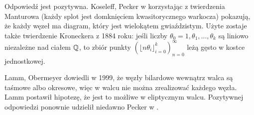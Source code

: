 Odpowiedź jest pozytywna.
Koseleff, Pecker w \cite{koseleff14} korzystając z twierdzenia Manturowa (każdy splot jest domknięciem kwasitorycznego warkocza) pokazują, że każdy węzeł ma diagram, który jest wielokątem gwiaździstym.
Użyte zostaje także twierdzenie Kroneckera z 1884 roku: jeśli liczby $\theta_0 = 1, \theta_1, \ldots, \theta_k$ są liniowo niezależne nad ciałem $\mathbb Q$, to zbiór punkty $(\lfloor n\theta_i \rfloor_{i=0}^k)_{n=0}^\infty$ leżą gęsto w kostce jednostkowej.

Lamm, Obermeyer dowiedli w 1999, że węzły bilardowe wewnątrz walca są taśmowe albo okresowe, więc w walcu nie można zrealizować każdego węzła.
Lamm postawił hipotezę, że jest to możliwe w eliptycznym walcu.
Pozytywnej odpowiedzi ponownie udzielił niedawno Pecker w \cite{pecker12}.


